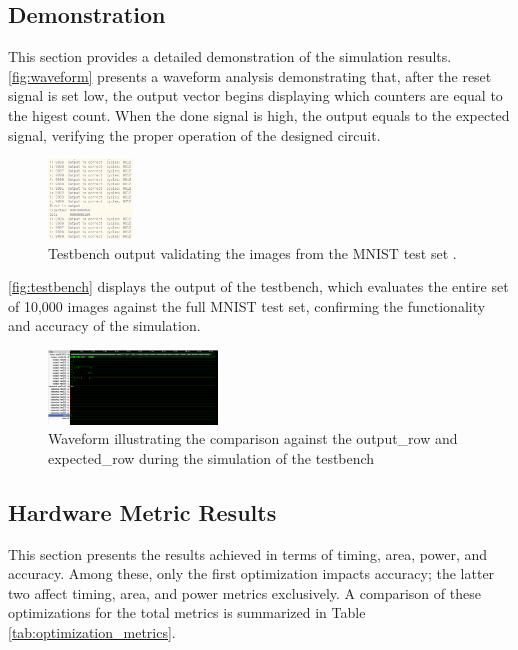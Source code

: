 \documentclass[conference]{IEEEtran}
\begin{document}
\subsection{Demonstration}
This section provides a detailed demonstration of the simulation results. 
\autoref{fig:waveform} presents a waveform analysis demonstrating that, after the reset signal is set low, the output vector begins displaying which counters are equal to the higest count. When the done signal is high, the output equals to the expected signal, verifying the proper operation of the designed circuit.

\begin{figure}[h]
    \centering
    \includegraphics[width=0.2\textwidth]{./testbench.png}
    \caption{Testbench output validating the images from the MNIST test set \cite{mnist}.}
    \label{fig:testbench}
\end{figure}

\autoref{fig:testbench} displays the output of the testbench, which evaluates the entire set of 10,000 images against the full MNIST test set, confirming the functionality and accuracy of the simulation.

\begin{figure}[h]
    \centering
    \includegraphics[width=0.4\textwidth]{./Waveform_picture.png}
    \caption{Waveform illustrating the comparison against the output\_row and expected\_row during the simulation of the testbench}
    \label{fig:waveform}
\end{figure}





\subsection{Hardware Metric Results}
\label{ref:hardware_metrics}

This section presents the results achieved in terms of timing, area, power, and accuracy. Among these, only the first optimization impacts accuracy; the latter two affect timing, area, and power metrics exclusively. A comparison of these optimizations for the total metrics is summarized in Table \ref{tab:optimization_metrics}. 
\end{document}
